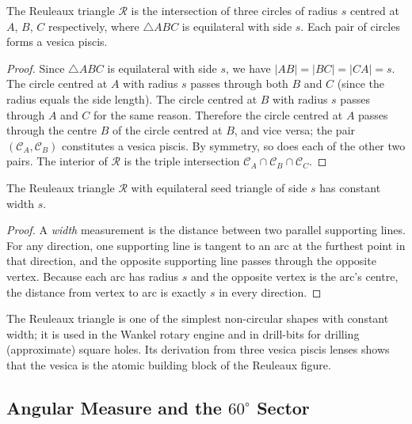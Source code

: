 \begin{theorem}\label{thm:reuleaux}
The Reuleaux triangle \(\mathcal{R}\) is the intersection of three circles
of radius \(s\) centred at \(A\), \(B\), \(C\) respectively, where
\(\triangle ABC\) is equilateral with side \(s\).
Each pair of circles forms a vesica piscis.
\end{theorem}

\begin{proof}
Since \(\triangle ABC\) is equilateral with side \(s\), we have
\(|AB| = |BC| = |CA| = s\).
The circle centred at \(A\) with radius \(s\) passes through both
\(B\) and \(C\) (since the radius equals the side length).
The circle centred at \(B\) with radius \(s\) passes through \(A\)
and \(C\) for the same reason.
Therefore the circle centred at \(A\) passes through the centre
\(B\) of the circle centred at \(B\), and vice versa; the pair
\((\mathcal{C}_A, \mathcal{C}_B)\) constitutes a vesica piscis.
By symmetry, so does each of the other two pairs.
The interior of \(\mathcal{R}\) is the triple intersection
\(\mathcal{C}_A \cap \mathcal{C}_B \cap \mathcal{C}_C\).
\end{proof}

\begin{proposition}\label{prop:constant-width}
The Reuleaux triangle \(\mathcal{R}\) with equilateral seed triangle of
side \(s\) has constant width \(s\).
\end{proposition}

\begin{proof}
A \emph{width} measurement is the distance between two parallel
supporting lines.
For any direction, one supporting line is tangent to an arc at the
furthest point in that direction, and the opposite supporting line
passes through the opposite vertex.
Because each arc has radius \(s\) and the opposite vertex is the
arc's centre, the distance from vertex to arc is exactly \(s\) in
every direction.
\end{proof}

The Reuleaux triangle is one of the simplest non-circular shapes with
constant width; it is used in the Wankel rotary engine and in
drill-bits for drilling (approximate) square holes.
Its derivation from three vesica piscis lenses shows that the vesica
is the atomic building block of the Reuleaux figure.

\subsection{Angular Measure and the \(60^\circ\) Sector}
\label{subsec:ch11-angle}

